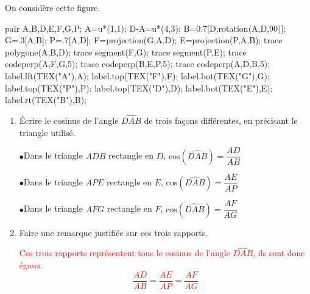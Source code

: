     On considère cette figure.

    \begin{center}
        \begin{Geometrie}
            pair A,B,D,E,F,G,P;
            A=u*(1,1);
            D-A=u*(4,3);
            B=0.7[D,rotation(A,D,90)];
            G=.3[A,B];
            P=.7[A,D];
            F=projection(G,A,D);
            E=projection(P,A,B);
            trace polygone(A,B,D);
            trace segment(F,G);
            trace segment(P,E);
            trace codeperp(A,F,G,5);
            trace codeperp(B,E,P,5);
            trace codeperp(A,D,B,5);
            label.lft(TEX("A"),A);
            label.top(TEX("F"),F);
            label.bot(TEX("G"),G);
            label.top(TEX("P"),P);
            label.top(TEX("D"),D);
            label.bot(TEX("E"),E);
            label.rt(TEX("B"),B);
        \end{Geometrie}
    \end{center}
    \begin{enumerate}
        \item Écrire le cosinus de l'angle $\widehat{DAB}$ de trois façons différentes, en précisant le triangle utilisé.

        {\color{red}
        \begin{itemize}
            \def\item{$\bullet$}
            \item Dans le triangle $ADB$ rectangle en $D$, $\text{cos}(\widehat{DAB})=\dfrac{AD}{AB}$

            \item Dans le triangle $APE$ rectangle en $E$, $\text{cos}(\widehat{DAB})=\dfrac{AE}{AP}$

            \item Dans le triangle $AFG$ rectangle en $F$, $\text{cos}(\widehat{DAB})=\dfrac{AF}{AG}$
        \end{itemize}
        }
        \item Faire une remarque justifiée sur ces trois rapports.

        \textcolor{red}{Ces trois rapports représentent tous le cosinus de l'angle $\widehat{DAB}$, ils sont donc égaux. $$\dfrac{AD}{AB}=\dfrac{AE}{AP}=\dfrac{AF}{AG}$$}
    \end{enumerate}
